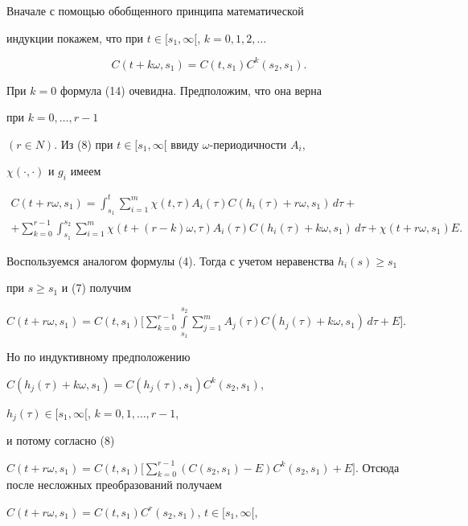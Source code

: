 \begin{pf}


Вначале с помощью обобщенного принципа математической


индукции покажем, что при $t\in[s_1,\infty[$, $k=0,1,2,\dotsc$


\begin{equation}


C(t+k\omega,s_1)=C(t,s_1)C^k(s_2,s_1).


\end{equation}


При $k=0$ формула (14) очевидна. Предположим, что она верна 


при $k=0,\dotsc, r-1$


$(r\in N)$. Из (8) при $t\in[s_1,\infty[$ ввиду $\omega$-периодичности $A_i$,


$\chi(\cdot,\cdot)$ и $g_i$ имеем


\begin{gather*}


C(t+r\omega,s_1)=\int_{s_1}^t\sum_{i=1}^m \chi(t,\tau)A_i(\tau)


C(h_i(\tau)+r\omega,s_1)\,d\tau+ \\


%


+\sum_{k=0}^{r-1}\int_{s_1}^{s_2}\sum_{i=1}^m \chi(t+(r-k)


\omega,\tau)A_i(\tau)C(h_i(\tau)+k\omega,s_1)\,d\tau+\chi(t+r\omega, s_1)E.


\end{gather*}


Воспользуемся аналогом формулы (4). Тогда с учетом неравенства $h_i(s)\ge s_1$


при $s\ge s_1$ и (7) получим


$C(t+r\omega,s_1)=C(t,s_1)\Big[\sum\limits_{k=0}^{r-1}\int\limits_{s_1}^{s_2}


\sum\limits_{j=1}^m A_j(\tau)C(h_j(\tau)+k\omega,s_1)\,d\tau+E\Big]$.


Но по индуктивному предположению 


$C(h_j(\tau)+k\omega,s_1)=C(h_j(\tau),s_1)C^k(s_2,s_1)$,


$h_j(\tau)\in[s_1,\infty[$, $k=0,1,\dotsc,r-1$,


и потому согласно (8)


$C(t+r\omega,s_1)=C(t,s_1)\Big[\sum\limits_{k=0}^{r-1}(C(s_2,s_1)-E)C^k(s_2,


s_1)+E\Big]$. Отсюда после несложных преобразований получаем


$C(t+r\omega,s_1)=C(t,s_1)C^r(s_2,s_1)$,  $t\in[s_1,\infty[$,



\end{pf}
